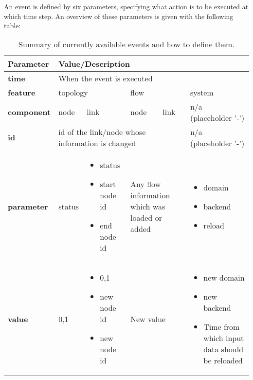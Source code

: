 \documentclass[11pt,fleqn]{book} %
\begin{document}
An event is defined by six parameters, specifying what action is to be executed at which time step. An overview of these parameters is given with the following table:
\begin{table}[h]
	\centering
	\begin{tabular}{|l| l|l|l | l| l|}
	\hline
	\rowcolor{Gray}
	Parameter & \multicolumn{5}{l|}{Value/Description}\\
	\hline
	\textbf{time} & \multicolumn{5}{l|}{When the event is executed} \\ \hline
	\textbf{feature} & \multicolumn{2}{l|}{topology} & \multicolumn{2}{l|}{flow} & system \\ \hline
	\textbf{component} & node & link & node & link & n/a (placeholder '-') \\ \hline
	\textbf{id} & \multicolumn{4}{l|}{id of the link/node whose information is changed} & n/a (placeholder '-') \\
	\hline
	\textbf{parameter} & status & \multicolumn{1}{p{2.5cm}|}{\begin{itemize}[leftmargin=*,label={-}]
			\item status
			\item start node id
			\item end node id
		\end{itemize}} & \multicolumn{2}{p{4.5cm}|}{Any flow information which was loaded or added} & \multicolumn{1}{p{2.5cm}|}{\begin{itemize}[leftmargin=*,label={-}]
		\item domain
		\item backend
		\item reload
	\end{itemize}}\\
	\hline
	\textbf{value} & 0,1 & \multicolumn{1}{p{2.5cm}|}{\begin{itemize}[leftmargin=*,label={-}]
			\item 0,1
			\item new node id
			\item new node id
		\end{itemize}} & \multicolumn{2}{p{4.5cm}|}{New value} & \multicolumn{1}{p{3cm}|}{\begin{itemize}[leftmargin=*,label={-}]
		\item new domain
		\item new backend
		\item Time from which input data should be reloaded
	\end{itemize}}\\
	\hline	
	\end{tabular}
	\caption{Summary of currently available events and how to define them.}
	\label{table:events}
\end{table}
\end{document}
